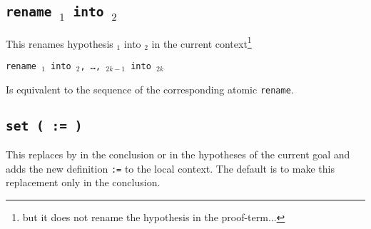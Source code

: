 \begin{coq_example*}
\begin{Variants}
\end{Variants}

\begin{ErrMsgs}

\item {}

\item {}

\item {}

\end{ErrMsgs}

\subsection{\tt rename {\ident$_1$} into {\ident$_2$}}

This renames hypothesis {\ident$_1$} into {\ident$_2$} in the current
context\footnote{but it does not rename the hypothesis in the
  proof-term...}

\begin{Variants}

\item {\tt rename {\ident$_1$} into {\ident$_2$}, \ldots,
    {\ident$_{2k-1}$} into {\ident$_{2k}$}}

Is equivalent to the sequence of the corresponding atomic {\tt rename}.

\end{Variants}

\begin{ErrMsgs}

\item {}

\item {}

\end{ErrMsgs}

\subsection{\tt set ( {\ident} := {\term} )}
\label{tactic:set}

This replaces {\term} by {\ident} in the conclusion or in the
hypotheses of the current goal and adds the new definition {\ident
{\tt :=} \term} to the local context. The default is to make this
replacement only in the conclusion.


\end{coq_example*}

